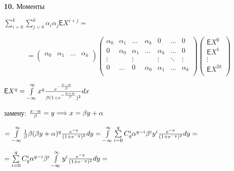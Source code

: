 \documentclass[a4paper,12pt]{article}
\begin{document}
\noindent\textbf{10.} Моменты

\begin{center}
    ${\sum\limits_{i = 0}^k}\sum\limits_{j=0}^k\alpha_i \alpha_j \mathsf{E}X^{i + j} = $
\end{center}

\begin{displaymath}
    = \begin{pmatrix}
        \alpha_0 & \alpha_1 & \ldots & \alpha_k \\
    \end{pmatrix} \begin{pmatrix}
        \alpha_0 & \alpha_1 & \ldots & \alpha_k & 0 & \ldots & 0 \\
        0 & \alpha_0 & \alpha_1 & \ldots & \alpha_k & \ldots & 0 \\
        \vdots &  & \vdots &  & \vdots & \ddots & \vdots\\
        0 & \ldots & 0 & \alpha_0 & \alpha_1 &\ldots & \alpha_k \\
    \end{pmatrix} \begin{pmatrix}
        \mathsf{E}X^{\mathsf{0}} \\ \mathsf{E}X^\mathsf{1} \\ \vdots \\ \mathsf{E}X^{\mathsf{2}k} \\
    \end{pmatrix}
\end{displaymath}

\begin{center}
    $\mathsf{E}X^{q} = \int\limits_{-\infty}^{\infty} x^{q} {e^{-{x - \alpha\over{\beta}}}\over{\beta(1 + e^{-{x - \alpha\over{\beta}}}})^2} d x$
\end{center}

 замену: ${x - \alpha\over{\beta}} = y \Longrightarrow x = \beta y + \alpha$

\begin{center}
    $= \int\limits_{-\infty}^{\infty} {1\over{\beta}} \beta (\beta y + \alpha)^q {e^{-y}\over{(1 + e^{-y}})^2} d y = \int\limits_{-\infty}^{\infty} \sum\limits_{i = 0}^q C_q^i \alpha^{q - i} \beta^i y^i {e^{-y}\over{(1 + e^{-y}})^2} d y = $
\end{center}

\begin{center}
    $= \sum\limits_{i = 0}^q C_q^i \alpha^{q - i} \beta^{i}  \int\limits_{-\infty}^{\infty} y^i {e^{-y}\over{(1 + e^{-y}})^2} d y =$
\end{center}
\end{document}
